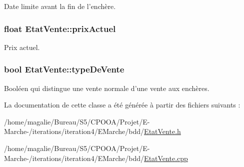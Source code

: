 Date limite avant la fin de l'enchère. 

\hypertarget{class_etat_vente_a69258e9f4890fc1fe84e5afdba35bc0f}{
\subsubsection[{prix\-Actuel}]{\setlength{\rightskip}{0pt plus 5cm}float Etat\-Vente\-::prix\-Actuel\hspace{0.3cm}{\ttfamily [protected]}}}\label{class_etat_vente_a69258e9f4890fc1fe84e5afdba35bc0f}


Prix actuel. 

\hypertarget{class_etat_vente_a6fac909bb6c53a68450ff1f1e287e298}{
\subsubsection[{type\-De\-Vente}]{\setlength{\rightskip}{0pt plus 5cm}bool Etat\-Vente\-::type\-De\-Vente\hspace{0.3cm}{\ttfamily [protected]}}}\label{class_etat_vente_a6fac909bb6c53a68450ff1f1e287e298}


Booléen qui distingue une vente normale d'une vente aux enchères. 



La documentation de cette classe a été générée à partir des fichiers suivants \-:\begin{DoxyCompactItemize}
\item 
/home/magalie/\-Bureau/\-S5/\-C\-P\-O\-O\-A/\-Projet/\-E-\/\-Marche-\//iterations/iteration4/\-E\-Marche/bdd/\hyperlink{_etat_vente_8h}{Etat\-Vente.\-h}\item 
/home/magalie/\-Bureau/\-S5/\-C\-P\-O\-O\-A/\-Projet/\-E-\/\-Marche-\//iterations/iteration4/\-E\-Marche/bdd/\hyperlink{_etat_vente_8cpp}{Etat\-Vente.\-cpp}\end{DoxyCompactItemize}
